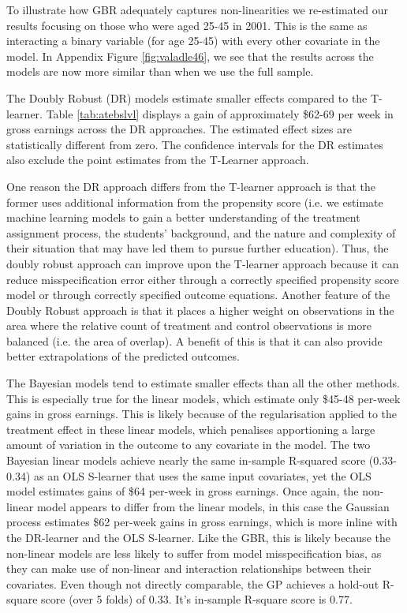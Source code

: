 \documentclass[12pt, a4paper]{article}
\begin{document}
To illustrate how GBR adequately captures non-linearities we re-estimated our results focusing on those who were aged 25-45 in 2001. This is the same as interacting a binary variable (for age 25-45) with every other covariate in the model. In Appendix Figure \ref{fig:valadle46}, we see that the results across the models are now more similar than when we use the full sample.

The Doubly Robust (DR) models estimate smaller effects compared to the T-learner. Table \ref{tab:atebslvl} displays a gain of approximately \$62-69 per week in gross earnings across the DR approaches. The estimated effect sizes are statistically different from zero. The confidence intervals for the DR estimates also exclude the point estimates from the T-Learner approach.

One reason the DR approach differs from the T-learner approach is that the former uses additional information from the propensity score (i.e. we estimate machine learning models to gain a better understanding of the treatment assignment process, the students’ background, and the nature and complexity of their situation that may have led them to pursue further education). Thus, the doubly robust approach can improve upon the T-learner approach because it can reduce misspecification error either through a correctly specified propensity score model or through correctly specified outcome equations. Another feature of the Doubly Robust approach is that it places a higher weight on observations in the area where the relative count of treatment and control observations is more balanced (i.e. the area of overlap). A benefit of this is that it can also provide better extrapolations of the predicted outcomes. 

The Bayesian models tend to estimate smaller effects than all the other
methods. This is especially true for the linear models, which estimate only
\$45-48 per-week gains in gross earnings. This is likely because of the
regularisation applied to the treatment effect in these linear models, which
penalises apportioning a large amount of variation in the outcome to any
covariate in the model. The two Bayesian linear models achieve nearly the same
in-sample R-squared score (0.33-0.34) as an OLS S-learner that uses the same
input covariates, yet the OLS model estimates gains of \$64 per-week in gross
earnings. Once again, the non-linear model appears to differ from the linear
models, in this case the Gaussian process estimates \$62 per-week gains in
gross earnings, which is more inline with the DR-learner and the OLS
S-learner. Like the GBR, this is likely because the non-linear models are less
likely to suffer from model misspecification bias, as they can make use of
non-linear and interaction relationships between their covariates. Even though
not directly comparable, the GP achieves a hold-out R-square score (over 5
folds) of 0.33. It's in-sample R-square score is 0.77.
\end{document}

